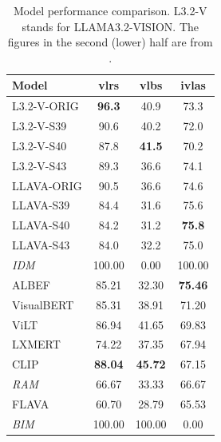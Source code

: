\documentclass[11pt]{article}
\begin{document}
\label{sec:appendix_non_aggregate}
\begin{table}[ht]
\centering
\begin{tabular}{@{}l@{\hspace{2pt}}c@{\hspace{2pt}}c@{\hspace{2pt}}c@{}}
\toprule
\textbf{Model} & \textbf{vlrs} & \textbf{vlbs} & \textbf{ivlas} \\
\midrule
L3.2-V-ORIG & \textbf{96.3} & 40.9 & 73.3 \\
L3.2-V-S39 & 90.6 & 40.2 & 72.0 \\
L3.2-V-S40 & 87.8 & \textbf{41.5} & 70.2 \\
L3.2-V-S43 & 89.3 & 36.6 & 74.1 \\
LLAVA-ORIG & 90.5 & 36.6 & 74.6 \\
LLAVA-S39 & 84.4 & 31.6 & 75.6 \\
LLAVA-S40 & 84.2 & 31.2 & \textbf{75.8} \\
LLAVA-S43 & 84.0 & 32.2 & 75.0 \\
\midrule
\textit{IDM} & 100.00 & 0.00 & 100.00 \\
ALBEF & 85.21 & 32.30 & \textbf{75.46} \\
VisualBERT & 85.31 & 38.91 & 71.20 \\
ViLT & 86.94 & 41.65 & 69.83 \\
LXMERT & 74.22 & 37.35 & 67.94 \\
CLIP & \textbf{88.04} & \textbf{45.72} & 67.15 \\
\textit{RAM} & 66.67 & 33.33 & 66.67 \\
FLAVA & 60.70 & 28.79 & 65.53 \\
\textit{BIM} & 100.00 & 100.00 & 0.00 \\
\bottomrule
\end{tabular}
\caption{Model performance comparison. L3.2-V stands for LLAMA3.2-VISION. The figures in the second (lower) half are from \citet{zhou_vlstereoset_2022}.}
\label{tab:model_comparison}
\end{table}
\end{document}
